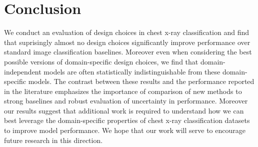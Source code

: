 \section{Conclusion}
We conduct an evaluation of design choices in chest x-ray classification and find that suprisingly almost no design choices significantly improve performance over standard image classification baselines. Moreover even when considering the best possible versions of domain-specific design choices, we find that domain-independent models are often statistically indistinguishable from these domain-specific models. The contrast between these results and the performance reported in the literature emphasizes the importance of comparison of new methods to strong baselines and robust evaluation of uncertainty in performance. Moreover our results suggest that additional work is required to understand how we can best leverage the domain-specific properties of chest x-ray classification datasets to improve model performance. We hope that our work will serve to encourage future research in this direction.

